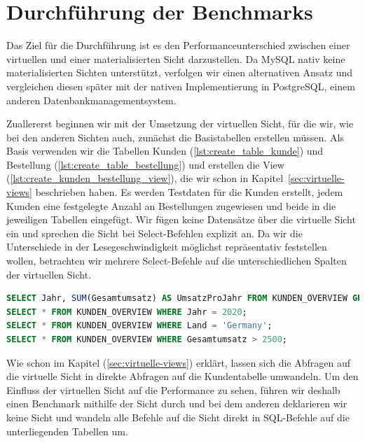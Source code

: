 \section{Durchführung der Benchmarks}\label{sec:durchfuhrung-der-benchmarks}

Das Ziel für die Durchführung ist es den Performanceunterschied zwischen einer virtuellen und einer materialisierten Sicht darzustellen.
Da MySQL nativ keine materialisierten Sichten unterstützt, verfolgen wir einen alternativen Ansatz und vergleichen diesen später mit der nativen Implementierung in PostgreSQL, einem anderen Datenbankmanagementsystem.

Zuallererst beginnen wir mit der Umsetzung der virtuellen Sicht, für die wir, wie bei den anderen Sichten auch, zunächst die Basistabellen erstellen müssen.
Als Basis verwenden wir die Tabellen Kunden (\ref{lst:create_table_kunde}) und Bestellung (\ref{lst:create_table_bestellung}) und erstellen die View (\ref{lst:create_kunden_bestellung_view}), die wir schon in Kapitel~\ref{sec:virtuelle-views} beschrieben haben.
Es werden Testdaten für die Kunden erstellt, jedem Kunden eine festgelegte Anzahl an Bestellungen zugewiesen und beide in die jeweiligen Tabellen eingefügt.
Wir fügen keine Datensätze über die virtuelle Sicht ein und sprechen die Sicht bei Select-Befehlen explizit an.
Da wir die Unterschiede in der Lesegeschwindigkeit möglichst repräsentativ feststellen wollen, betrachten wir mehrere Select-Befehle auf die unterschiedlichen Spalten der virtuellen Sicht.

\vspace{-5pt}
\begin{lstlisting}[language=SQL,caption=Select-Abfragen auf alle Spalten der View,label={lst:view-select-query}]
SELECT Jahr, SUM(Gesamtumsatz) AS UmsatzProJahr FROM KUNDEN_OVERVIEW GROUP BY Jahr;
SELECT * FROM KUNDEN_OVERVIEW WHERE Jahr = 2020;
SELECT * FROM KUNDEN_OVERVIEW WHERE Land = 'Germany';
SELECT * FROM KUNDEN_OVERVIEW WHERE Gesamtumsatz > 2500;
\end{lstlisting}
\vspace{-5pt}

Wie schon im Kapitel (\ref{sec:virtuelle-views}) erklärt, lassen sich die Abfragen auf die virtuelle Sicht in direkte Abfragen auf die Kundentabelle umwandeln.
Um den Einfluss der virtuellen Sicht auf die Performance zu sehen, führen wir deshalb einen Benchmark mithilfe der Sicht durch und bei dem anderen deklarieren wir keine Sicht und wandeln alle Befehle auf die Sicht direkt in SQL-Befehle auf die unterliegenden Tabellen um.

